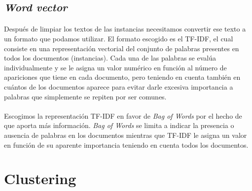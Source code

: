 \documentclass[10pt,a4paper]{article}
\begin{document}
	\subsection{\textit{Word vector}}
	\paragraph{}
	Después de limpiar los textos de las instancias necesitamos convertir ese texto a un formato que podamos utilizar. El formato escogido es el TF-IDF, el cual consiste en una representación vectorial del conjunto de palabras presentes en todos los documentos (instancias). Cada una de las palabras se evalúa individualmente y se le asigna un valor numérico en función al número de apariciones que tiene en cada documento, pero teniendo en cuenta también en cuántos de los documentos aparece para evitar darle excesiva importancia a palabras que simplemente se repiten por ser comunes.
	\paragraph{}
	Escogimos la representación TF-IDF en favor de \textit{Bag of Words} por el hecho de que aporta más información. \textit{Bag of Words} se limita a indicar la presencia o ausencia de palabras en los documentos mientras que TF-IDF le asigna un valor en función de su aparente importancia teniendo en cuenta todos los documentos.

\section{Clustering}
\end{document}
